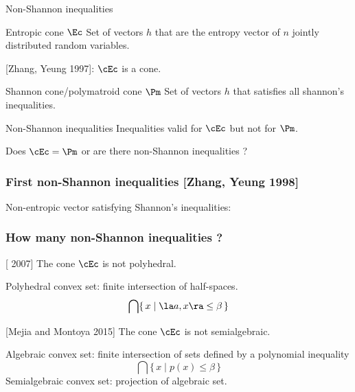 \documentclass[10pt,svgnames,usenames,table]{beamer}
\begin{document}
  \begin{frame}{Non-Shannon inequalities}
    \begin{block}{Entropic cone $\Ec$}
      Set of vectors $h$ that are the entropy vector of $n$ jointly distributed random variables.

      [Zhang, Yeung 1997]: $\cEc$ is a cone.
    \end{block}
    \begin{block}{Shannon cone/polymatroid cone $\Pm$}
      Set of vectors $h$ that satisfies all shannon's inequalities.
    \end{block}
    \begin{block}{Non-Shannon inequalities}
      Inequalities valid for $\cEc$ but not for $\Pm$.
    \end{block}

    Does $\cEc = \Pm$ or are there non-Shannon inequalities ?
  \end{frame}

  \begin{frame}
    \frametitle{First non-Shannon inequalities [Zhang, Yeung 1998]}
    Non-entropic vector satisfying Shannon's inequalities:
  \end{frame}

  \begin{frame}
    \frametitle{How many non-Shannon inequalities ?}
    \begin{block}{[\matus{} 2007]}
      The cone $\cEc$ is not polyhedral.

      Polyhedral convex set: finite intersection of half-spaces.
      \[ \bigcap \{\, x \mid \la a, x \ra \leq \beta \,\} \]
    \end{block}
    \begin{block}{[Mejia and Montoya 2015]}
      The cone $\cEc$ is not semialgebraic.

      Algebraic convex set: finite intersection of sets defined by a polynomial inequality
      \[ \bigcap \{\, x \mid p(x) \leq \beta \,\} \]
      Semialgebraic convex set: projection of algebraic set.
    \end{block}
  \end{frame}
\end{document}
